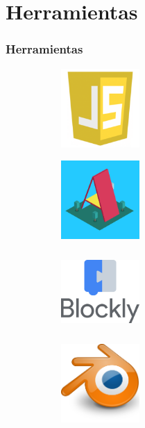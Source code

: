 \documentclass[xcolor={table}]{beamer}
\begin{document}
	\section{Herramientas}
		\begin{frame}
			\frametitle{Herramientas}
                \begin{figure}[H]
                \centering
                \begin{subfigure}{\textwidth}
                    \includegraphics[width=3cm, height=3cm]{img/js.png}
                \label{fig:figure2_4}
                \end{subfigure}
                \begin{subfigure}{\textwidth}
                    \includegraphics[width=3cm, height=3cm]{img/aframe.png}
                \label{fig:figure2_5}
                \end{subfigure}\hfill
                \begin{subfigure}{\textwidth}
                    \includegraphics[width=3cm, height=3cm]{img/blockly.png}
                \label{fig:figure2_6}
                \end{subfigure}\hfill
                \begin{subfigure}{\textwidth}
                    \includegraphics[width=3cm, height=3cm]{img/blender.png}

\end{subfigure}
\end{figure}
\end{frame}
\end{document}
